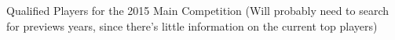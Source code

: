 Qualified Players for the 2015 Main Competition
(Will probably need to search for previews years, since there's little information on the current top players)


%
%  

